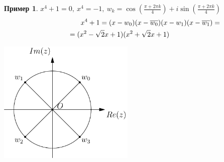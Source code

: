 \documentclass[a4paper, 12pt]{article}
\newcommand\tab[1][.5cm]{\hspace*{#1}}
\theoremstyle{definition}
\newtheorem*{example1}{Пример}
\begin{document}
  \begin{example1}
    $x^4 +1=0, \ x^4 = -1, \ w_k = \cos(\frac{\pi+2\pi k}{4})+ i\sin (\frac{\pi+2\pi k}{4})$
    \begin{multline*}
      \tab[2cm]x^4 +1= (x-w_0)(x-\overline{w_0})(x-w_1)(x-\overline{w_1}) = \\
      = (x^2 - \sqrt{2}x + 1)(x^2 + \sqrt{2}x + 1)\tab[1cm]
      \
    \end{multline*}
    \begin{center}
    
      \includegraphics[width=6.5cm]{image/lecture-23.pdf}
    \end{center}
  \end{example1}
\end{document}

